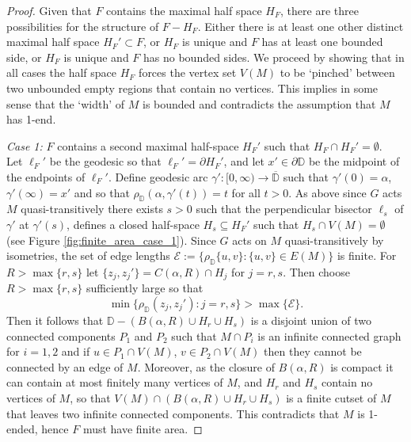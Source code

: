 \documentclass{article}
\numberwithin{equation}{section}
\theoremstyle{definition}
\theoremstyle{remark}
\begin{document}
\begin{proof}
Given that $F$ contains the maximal half space $H_F$, there are three possibilities for the structure of $F-H_F$. Either there is at least one other distinct maximal half space $H_F'\subset F$, or $H_F$ is unique and $F$ has at least one bounded side, or $H_F$ is unique and $F$ has no bounded sides. We proceed by showing that in all cases the half space $H_F$ forces the vertex set $V(M)$ to be `pinched' between two unbounded empty regions that contain no vertices. This implies in some sense that the `width' of $M$ is bounded and contradicts the assumption that $M$ has 1-end.
  
  \textit{Case 1:} $F$ contains a second maximal half-space $H_F'$ such that $H_F\cap H_F'=\emptyset$.\\
  Let $\ell_F'$ be the geodesic so that $\ell_F'=\partial H_F'$, and let $x'\in\partial \mathbb{D}$ be the midpoint of the endpoints of $\ell_F'$. Define geodesic arc $\gamma':[0,\infty)\rightarrow\overline{\mathbb{D}}$ such that $\gamma'(0)=\alpha$, $\gamma'(\infty)=x'$ and so that $\rho_\mathbb{D}(\alpha,\gamma'(t))=t$ for all $t>0$. As above since $G$ acts $M$ quasi-transitively there exists $s>0$ such that the perpendicular bisector $\ell_s$ of $\gamma'$ at $\gamma'(s)$, defines a closed half-space $H_s\subseteq H_F'$ such that $H_s\cap V(M)=\emptyset$ (see Figure \ref{fig:finite_area_case_1}). Since $G$ acts on $M$ quasi-transitively by isometries, the set of edge lengths $\mathcal{E}:=\{\rho_\mathbb{D}\{u,v\}:\{u,v\}\in E(M)\}$ is finite. For $R>\max\{r,s\}$ let $\{z_j,z_j'\}=C(\alpha,R)\cap H_j$ for $j=r,s$. Then choose $R>\max\{r,s\}$ sufficiently large so that 
  $$\min\{\rho_\mathbb{D}(z_j,z_j'):j=r,s\}>\max\{\mathcal{E}\}.$$
 Then it follows that $\mathbb{D}-(B(\alpha,R)\cup H_r\cup H_s)$ is a disjoint union of two connected components $P_1$ and $P_2$ such that $M\cap P_i$ is an infinite connected graph for $i=1,2$ and if $u\in P_1\cap V(M)$, $v\in P_2\cap V(M)$ then they cannot be connected by an edge of $M$. Moreover, as the closure of $B(\alpha,R)$ is compact it can contain at most finitely many vertices of $M$, and $H_r$ and $H_s$ contain no vertices of $M$, so that $V(M)\cap(B(\alpha,R)\cup H_r\cup H_s)$ is a finite cutset of $M$ that leaves two infinite connected components. This contradicts that $M$ is 1-ended, hence $F$ must have finite area.


\end{proof}
\end{document}
